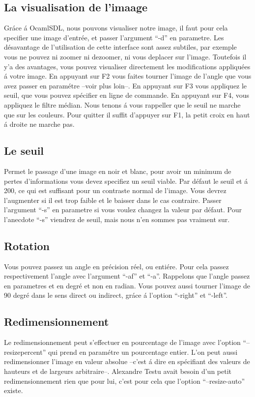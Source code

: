 \subsection{ La visualisation de l'imaage }
 Gr\'ace \'a OcamlSDL, nous pouvons visualiser notre image, il faut pour
 cela specifier une image d'entr\'ee, et passer l'argument ``-d'' en
 parametre. Les d\'esavantage de l'utilisation de cette interface sont
 assez subtiles, par exemple vous ne pouvez ni zoomer ni dezoomer, ni
 vous deplacer sur l'image. Toutefois il y'a des avantages, vous pouvez
 visualiser directement les modifications appliqu\'ees \'a votre
 image. En appuyant sur F2 vous faites tourner l'image de l'angle que
 vous avez passer en param\'etre --voir plus loin--. En appuyant sur F3
 vous appliquez le seuil, que vous pouvez sp\'ecifier en ligne de
 commande. En appuyant sur F4, vous appliquez le filtre m\'edian. Nous
 tenons \'a vous rappeller que le seuil ne marche que sur les couleurs.
 Pour quitter il suffit d'appuyer sur F1, la petit croix en haut \'a
 droite ne marche pas.
\subsection{ Le seuil }
 Permet le passage d'une image en noir et blanc, pour avoir un minimum
 de pertes d'informations vous devez specifiez un seuil viable. Par
 d\'efaut le seuil et \'a 200, ce qui est suffisant pour un contraste
 normal de l'image. Vous devrez l'augmenter si il est trop faible et le
 baisser dans le cas contraire. Passer l'argument ``-s'' en
 parametre si vous voulez changez la valeur par d\'efaut. Pour
 l'anecdote ``-s'' viendrez de seuil, mais nous n'en sommes pas vraiment
 sur.
\subsection{ Rotation }
 Vous pouvez passez un angle en pr\'ecision r\'eel, ou enti\'ere. Pour
 cela passez respectivement l'angle avec l'argument ``-af'' et ``-a''.
 Rappelons que l'angle passez en parametres et en degr\'e et non en
 radian. Vous pouvez aussi tourner l'image de 90 degr\'e dans le sens
 direct ou indirect, gr\'ace \'a l'option ``-right'' et ``-left''.
\subsection{ Redimensionnement }
 Le redimensionnement peut s'effectuer en pourcentage de l'image avec
 l'option ``--resizepercent'' qui prend en param\'etre un pourcentage
 entier. L'on peut aussi redimensionner l'image en valeur absolue
 --c'est \'a dire en sp\'ecifiant des valeurs de hauteurs et de largeurs
 arbitraire--. Alexandre Testu avait besoin d'un petit redimensionnement
 rien que pour lui, c'est pour cela que l'option ``--resize-auto''
 existe.

